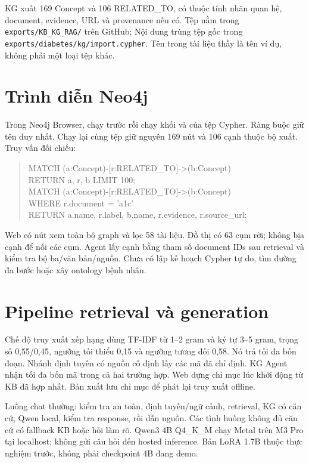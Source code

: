 KG xuất 169 Concept và 106 RELATED\_TO, có thuộc tính nhãn quan hệ, document, evidence, URL và provenance nếu có. Tệp  nằm trong \nolinkurl{exports/KB_KG_RAG/} trên GitHub; Nội dung trùng tệp gốc trong \nolinkurl{exports/diabetes/kg/import.cypher}. Tên  trong tài liệu thầy là tên ví dụ, không phải một loại tệp khác.


\section{Trình diễn Neo4j}
Trong Neo4j Browser, chạy  trước rồi chạy khối  và  của tệp Cypher. Ràng buộc giữ tên  duy nhất. Chạy lại cùng tệp giữ nguyên 169 nút và 106 cạnh thuộc bộ xuất. Truy vấn đối chiếu:
\begin{quote}\small\ttfamily
MATCH (a:Concept)-[r:RELATED\_TO]->(b:Concept)\\
RETURN a, r, b LIMIT 100;\\[4pt]
MATCH (a:Concept)-[r:RELATED\_TO]->(b:Concept)\\
WHERE r.document = 'a1c'\\
RETURN a.name, r.label, b.name, r.evidence, r.source\_url;
\end{quote}
Web có nút xem toàn bộ graph và lọc 58 tài liệu. Đồ thị có 63 cụm rời; không bịa cạnh để nối các cụm. Agent lấy cạnh bằng tham số document IDs sau retrieval và kiểm tra bộ ba/văn bản/nguồn. Chưa có lập kế hoạch Cypher tự do, tìm đường đa bước hoặc xây ontology bệnh nhân.

\section{Pipeline retrieval và generation}
Chế độ truy xuất xếp hạng dùng TF-IDF từ 1--2 gram và ký tự 3--5 gram, trọng số 0,55/0,45, ngưỡng tối thiểu 0,15 và ngưỡng tương đối 0,58. Nó trả tối đa bốn đoạn. Nhánh định tuyến có nguồn cố định lấy các mã đã chỉ định. KG Agent nhận tối đa bốn mã trong cả hai trường hợp. Web dựng chỉ mục lúc khởi động từ KB đã hợp nhất. Bản xuất  lưu chỉ mục để phát lại truy xuất offline.

Luồng chat thường: kiểm tra an toàn, định tuyến/ngữ cảnh, retrieval, KG có căn cứ, Qwen local, kiểm tra response, rồi dẫn nguồn. Các tình huống không đủ căn cứ có fallback KB hoặc hỏi làm rõ. Qwen3 4B Q4\_K\_M chạy Metal trên M3 Pro tại localhost; không gửi câu hỏi đến hosted inference. Bản LoRA 1.7B thuộc thực nghiệm trước, không phải checkpoint 4B đang demo.

